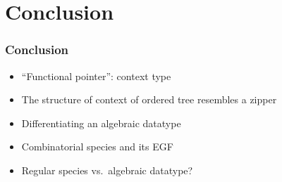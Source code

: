 \section{Conclusion}

\begin{frame}
\frametitle{Conclusion}

\begin{itemize}
\item ``Functional pointer'': context type
\item The structure of context of ordered tree resembles a zipper
\item Differentiating an algebraic datatype
\item Combinatorial species and its EGF
\item Regular species vs.\ algebraic datatype?
\end{itemize}
\end{frame}
